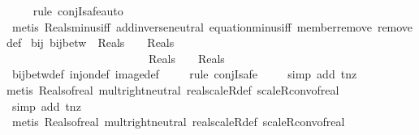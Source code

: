 \begin{isabellebody}
\ \ \ \ \isamarkupfalse%
{\isacharparenleft}rule\ conjI{\isacharcomma}safe{\isacharcomma}auto{\isacharparenright}\isanewline
\ \ \ \ \isamarkupfalse%
\ {\isacharparenleft}metis\ Reals{\isacharunderscore}minus{\isacharunderscore}iff\ add{\isachardot}inverse{\isacharunderscore}neutral\ equation{\isacharunderscore}minus{\isacharunderscore}iff\ member{\isacharunderscore}remove\ remove{\isacharunderscore}def{\isacharparenright}%
\endisatagproof
{\isafoldproof}%
%
\isadelimproof
\isanewline
%
\endisadelimproof
\isanewline
{}\isamarkupfalse%
\ bij{\isacharunderscore}{\isasymtau}{\isacharcolon}\ {\isachardoublequoteopen}bij{\isacharunderscore}betw\ {\isasymtau}\ {\isacharparenleft}{\isacharparenleft}Reals\ {\isacharminus}\ {\isacharbraceleft}{}{\isacharbraceright}{\isacharparenright}\ {\isasymtimes}\ {\isacharparenleft}Reals\ {\isacharminus}\ {\isacharbraceleft}{}{\isacharbraceright}{\isacharparenright}{\isacharparenright}\ \isanewline
\ \ \ \ \ \ \ \ \ \ \ \ \ \ \ \ \ \ \ \ \ \ \ \ \ {\isacharparenleft}{\isacharparenleft}Reals\ {\isacharminus}\ {\isacharbraceleft}{}{\isacharbraceright}{\isacharparenright}\ {\isasymtimes}\ {\isacharparenleft}Reals\ {\isacharminus}\ {\isacharbraceleft}{}{\isacharbraceright}{\isacharparenright}{\isacharparenright}{\isachardoublequoteclose}\isanewline
%
\isadelimproof
\ \ \ \ %
\endisadelimproof
%
\isatagproof
{}\isamarkupfalse%
\ bij{\isacharunderscore}betw{\isacharunderscore}def\ inj{\isacharunderscore}on{\isacharunderscore}def\ image{\isacharunderscore}def\isanewline
\ \ \ \ \isamarkupfalse%
{\isacharparenleft}rule\ conjI{\isacharcomma}safe{\isacharparenright}\isanewline
\ \ \ \ \isamarkupfalse%
{\isacharparenleft}simp\ add{\isacharcolon}\ t{\isacharunderscore}nz{\isacharparenright}{\isacharplus}\isanewline
\ \ \ \ \isamarkupfalse%
{\isacharparenleft}metis\ Reals{\isacharunderscore}of{\isacharunderscore}real\ mult{\isachardot}right{\isacharunderscore}neutral\ real{\isacharunderscore}scaleR{\isacharunderscore}def\ scaleR{\isacharunderscore}conv{\isacharunderscore}of{\isacharunderscore}real{\isacharparenright}\isanewline
\ \ \ \ \ \ \ \isamarkupfalse%
\ {\isacharparenleft}simp\ add{\isacharcolon}\ t{\isacharunderscore}nz{\isacharparenright}\isanewline
\ \ \ \ \isamarkupfalse%
\ {\isacharparenleft}metis\ Reals{\isacharunderscore}of{\isacharunderscore}real\ mult{\isachardot}right{\isacharunderscore}neutral\ real{\isacharunderscore}scaleR{\isacharunderscore}def\ scaleR{\isacharunderscore}conv{\isacharunderscore}of{\isacharunderscore}real{\isacharparenright}\isanewline

\end{isabellebody}
